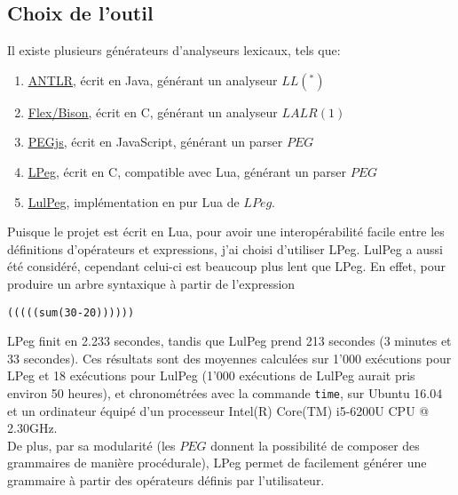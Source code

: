 \documentclass{article}
\begin{document}
\subsection{Choix de l'outil}
Il existe plusieurs générateurs d'analyseurs lexicaux, tels que: \begin{enumerate}
	\item \underline{\href{http://www.antlr.org/about.html}{ANTLR}}, écrit en Java, générant un analyseur $LL(^*)$
	\item \underline{\href{http://dinosaur.compilertools.net/}{Flex/Bison}}, écrit en C, générant un analyseur $LALR(1)$
	\item \underline{\href{https://pegjs.org/}{PEGjs}}, écrit en JavaScript, générant un parser $PEG$
	\item \underline{\href{https://github.com/LuaDist/lpeg}{LPeg}}, écrit en C, compatible avec Lua, générant un parser $PEG$
	\item \underline{\href{https://github.com/pygy/LuLPeg}{LulPeg}}, implémentation en pur Lua de $LPeg$.
\end{enumerate}
Puisque le projet est écrit en Lua, pour avoir une interopérabilité facile entre les définitions d'opérateurs et expressions, j'ai choisi d'utiliser LPeg. LulPeg a aussi été considéré, cependant celui-ci est beaucoup plus lent que LPeg. En effet, pour produire un arbre syntaxique à partir de l'expression 
\begin{verbatim}
(((((sum(30-20))))))
\end{verbatim}
LPeg finit en 2.233 secondes, tandis que LulPeg prend 213 secondes (3 minutes et 33 secondes). Ces résultats sont des moyennes calculées sur 1'000 exécutions pour LPeg et 18 exécutions pour LulPeg (1'000 exécutions de LulPeg aurait pris environ 50 heures), et chronométrées avec la commande \lstinline|time|, sur Ubuntu 16.04 et un ordinateur équipé d'un processeur Intel(R) Core(TM) i5-6200U CPU @ 2.30GHz. \\
De plus, par sa modularité (les $PEG$ donnent la possibilité de composer des grammaires de manière procédurale), LPeg permet de facilement générer une grammaire à partir des opérateurs définis par l'utilisateur.
\end{document}
